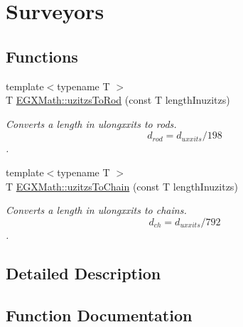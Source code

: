 \hypertarget{group___e_g_x_math-_conversions-_length_conversions-uzitzs-_surveyors}{}\section{Surveyors}
\label{group___e_g_x_math-_conversions-_length_conversions-uzitzs-_surveyors}
\subsection*{Functions}
\begin{DoxyCompactItemize}
\item 
{\footnotesize template$<$typename T $>$ }\\T \mbox{\hyperlink{group___e_g_x_math-_conversions-_length_conversions-uzitzs-_surveyors_gaf6062ab067930d296074de9e8301871d}{E\+G\+X\+Math\+::uzitzs\+To\+Rod}} (const T length\+Inuzitzs)
\begin{DoxyCompactList}\small\item\em Converts a length in ulongxxits to rods. \[ d_{rod}=d_{uxxits} /198 \]. \end{DoxyCompactList}\item 
{\footnotesize template$<$typename T $>$ }\\T \mbox{\hyperlink{group___e_g_x_math-_conversions-_length_conversions-uzitzs-_surveyors_ga34cbd9480a12684fe4138ba45a56692b}{E\+G\+X\+Math\+::uzitzs\+To\+Chain}} (const T length\+Inuzitzs)
\begin{DoxyCompactList}\small\item\em Converts a length in ulongxxits to chains. \[ d_{ch}=d_{uxxits} / 792 \]. \end{DoxyCompactList}\end{DoxyCompactItemize}


\subsection{Detailed Description}


\subsection{Function Documentation}
\mbox{\label{group___e_g_x_math-_conversions-_length_conversions-uzitzs-_surveyors_ga34cbd9480a12684fe4138ba45a56692b}} 
